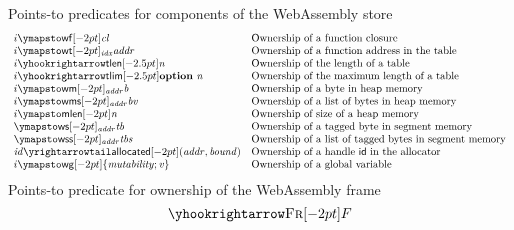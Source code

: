 \documentclass{standalone}
\begin{document}
Points-to predicates for components of the WebAssembly store
\begin{align*}
\begin{array}{ll}
  i\wfpt\V{cl} & \text{Ownership of a function closure}
  \\
  i\wtpt{\V{idx}} \V{addr} & \text{Ownership of a function address in the table}
  \\
  i \wtlenpt \V{n} & \text{Ownership of the length of a table}
  \\
    i \wtlimpt \V{\KK{option}~n} & \text{Ownership of the maximum length of a table}
  \\
  i \wmpt{\V{addr}} \V{b} & \text{Ownership of a byte in heap memory}
    \\
     i \wmspt{\V{addr}} \V{bv} & \text{Ownership of a list of bytes in heap memory}
	\\
  i \wmlenpt \V{n} & \text{Ownership of size of a heap memory}
  \\
  \wspt{\V{addr}} \V{tb} & \text{Ownership of a tagged byte in segment memory}
  \\
  \wsspt{\V{addr}} \V{tbs} & \text{Ownership of a list of tagged bytes in segment memory}
  \\
  \V{id}\allpt(\V{addr},\V{bound}) & \text{Ownership of a handle \xxWid in the allocator}
  \\
  i\wgpt\{\V{mutability};\V{v}\} & \text{Ownership of a global variable}
\end{array}
\end{align*}
Points-to predicate for ownership of the WebAssembly frame
\[ \frameR F \]
\end{document}
